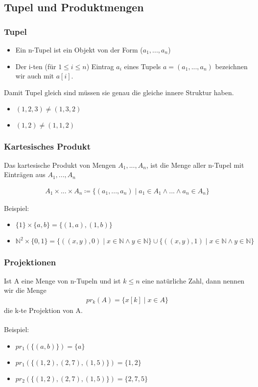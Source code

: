 \subsection{Tupel und Produktmengen}
\subsubsection{Tupel}
\begin{itemize}
    \item Ein n-Tupel ist ein Objekt von der Form ($a_1,...,a_n$)
    \item Der i-ten (für $1 \leq i \leq  n$) Eintrag $a_i$ eines Tupels $a = (a_1,...,a_n)$ bezeichnen wir auch mit $a[i]$.
\end{itemize}
Damit Tupel gleich sind müssen sie genau die gleiche innere Struktur haben.
\begin{itemize}
    \item $(1,2,3) \neq (1,3,2)$
    \item $(1,2) \neq (1,1,2)$
\end{itemize}
\subsubsection{Kartesisches Produkt}
Das kartesische Produkt von Mengen $A_1,...,A_n$, ist die Menge
aller n-Tupel mit Einträgen aus $A_1,...,A_n$

\begin{align*}
    A_1 \times ... \times A_n \coloneqq \{(a_1,...,a_n) \mid a_1 \in A_1 \wedge...\wedge a_n \in A_n\}
\end{align*}

Beispiel:
\begin{itemize}
    \item $\{1\} \times \{a,b\} = \{(1,a),(1,b)\}$
    \item $\mathbb{N}^{2} \times \{0,1\} = \{((x,y),0) \mid x \in \mathbb{N} \wedge y \in \mathbb{N}\} \cup \{((x,y),1) \mid x \in \mathbb{N} \wedge y \in \mathbb{N}\} $
\end{itemize}
\subsubsection{Projektionen}
Ist A eine Menge von n-Tupeln und ist $k \leq n$ eine natürliche Zahl,
dann nennen wir die Menge
\begin{align*}
    pr_{k}(A) = \{x[k] \mid x \in A\}
\end{align*}
die k-te Projektion von A.\\\\
Beispiel:
\begin{itemize}
    \item $pr_{1}(\{(a,b)\}) = \{a\}$
    \item $pr_{1}(\{(1,2),(2,7),(1,5)\}) = \{1,2\}$
    \item $pr_{2}(\{(1,2),(2,7),(1,5)\}) = \{2,7,5\}$
\end{itemize}
